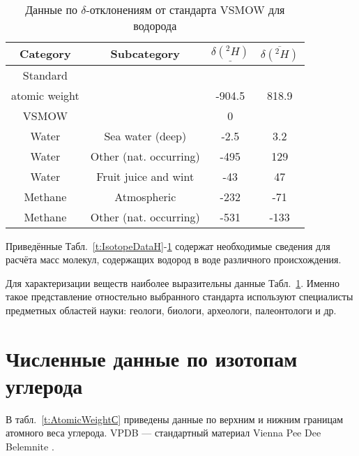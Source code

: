 \documentclass[a5paper,openany]{book}
\newcommand{\ov}{\overline}
\newcommand{\un}{\underline}
\begin{document}
\begin{table}[h]
	\centering
				{\footnotesize       
		\begin{tabular}{|c|c|c|c|}
			\hline
			Category &	Subcategory  & $\un{\delta(^2H)}$	&  $\ov{\delta(^2H)}$\\
			\hline
			Standard  & ~& ~ & ~   \\
			atomic weight & ~ & -904.5 & 818.9  \\
			\hline
			VSMOW & ~ &  0 & ~  \\
			\hline
			Water & Sea water (deep)&   -2.5 & 3.2 \\
			Water  & Other (nat. occurring) &   -495 & 129\\
			Water  & Fruit juice and wint  & -43 & 47 \\ 
			\hline
			Methane  & Atmospheric & -232 & -71 \\
			Methane  & Other (nat. occurring)  & -531 & -133 \\ 
			\hline
		\end{tabular}
	}
	\caption{Данные по $\delta$-отклонениям от стандарта VSMOW для водорода}
	\label{t:IsotopeDeltaH}
\end{table}

Приведённые Табл.~\ref{t:IsotopeDataH}-\ref{t:IsotopeDeltaH} содержат необходимые сведения для расчёта масс молекул, содержащих водород в воде различного происхождения.

Для характеризации веществ наиболее выразительны данные Табл.~\ref{t:IsotopeDeltaH}. Именно такое представление отностельно выбранного стандарта используют специалисты предметных областей науки: геологи, биологи, археологи, палеонтологи и др.

\section{Численные данные по изотопам углерода} \label{IsotopeDataС}

В табл.~\ref{t:AtomicWeightС} приведены данные по верхним и нижним границам атомного веса углерода.
VPDB --- стандартный материал Vienna Pee Dee Belemnite \cite{VPDB}. 
\end{document}
